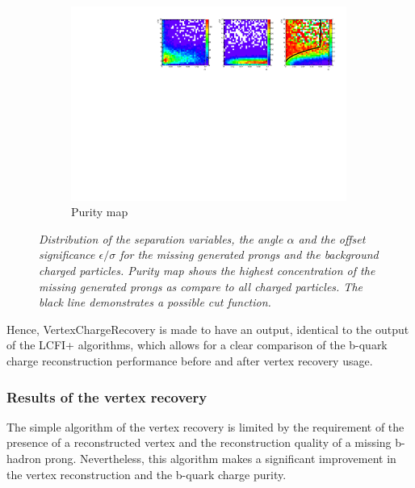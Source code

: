 \begin{figure}
\begin{subfigure}{0.33\textwidth}
		\includegraphics[clip, trim=13.6cm 0cm 0.4cm 0.cm,width=0.99\textwidth]{ILD/plots/recovery-purity.pdf}
		\caption{\label{fig:RecoveryPurity_c_3} Purity map}
	\end{subfigure}
	\caption{\sl Distribution of the separation variables, the angle $\alpha$ and the offset significance $\epsilon/\sigma$ for the missing generated prongs and the background charged particles. Purity map shows the highest concentration of the missing generated prongs as compare to all charged particles. The black line demonstrates a possible cut function. }
	
	\label{fig:RecoveryPurity_3}
\end{figure}

Hence, VertexChargeRecovery is made to have an output, identical to the output of the LCFI+ algorithms, which allows for a clear comparison of the b-quark charge reconstruction performance before and after vertex recovery usage.
\subsubsection{Results of the vertex recovery}

The simple algorithm of the vertex recovery is limited by the requirement of the presence of a reconstructed vertex and the reconstruction quality of a missing b-hadron prong. 
Nevertheless, this algorithm makes a significant improvement in the vertex reconstruction and the b-quark charge purity.

